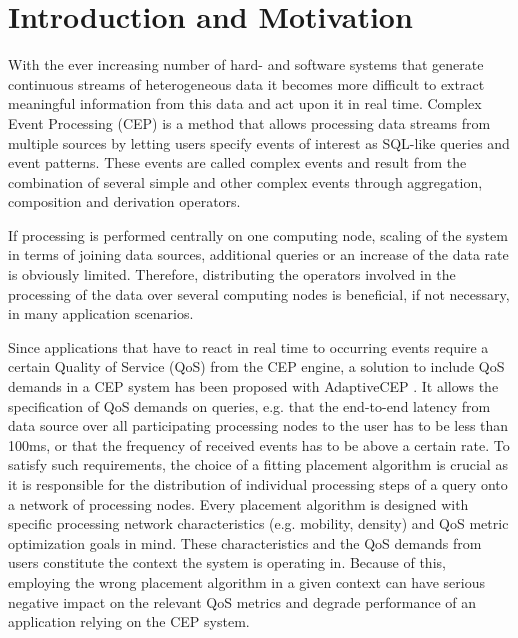 
 


\chapter{Introduction and Motivation}

	

With the ever increasing number of hard- and software systems that generate continuous streams of heterogeneous data it becomes more difficult to extract meaningful information from this data and act upon it in real time. 
Complex Event Processing (CEP) is a method that allows processing data streams from multiple sources by letting users specify events of interest as SQL-like queries and event patterns. These events are called complex events and result from the combination of several simple and other complex events through aggregation, composition and derivation operators.

If processing is performed centrally on one computing node, scaling of the system in terms of joining data sources, additional queries or an increase of the data rate is obviously limited. 
Therefore, distributing the operators involved in the processing of the data over several computing nodes is beneficial, if not necessary, in many application scenarios.

Since applications that have to react in real time to occurring events require a certain Quality of Service  (QoS) from the CEP engine, a solution to include QoS demands in a CEP system has been proposed with AdaptiveCEP \cite{Weisenburger2017a}. %
It allows the specification of QoS demands on queries, e.g. that the end-to-end latency from data source over all participating processing nodes to the user has to be less than 100ms, or that the frequency of received events has to be above a certain rate. To satisfy such requirements, the choice of a fitting placement algorithm is crucial as it is responsible for the distribution of individual processing steps of a query onto a network of processing nodes. Every placement algorithm is designed with specific processing network characteristics (e.g. mobility, density) and QoS metric optimization goals in mind. These characteristics and the QoS demands from users constitute the context the system is operating in. Because of this, employing the wrong placement algorithm in a given context can have serious negative impact on the relevant QoS metrics and degrade performance of an application relying on the CEP system. 

